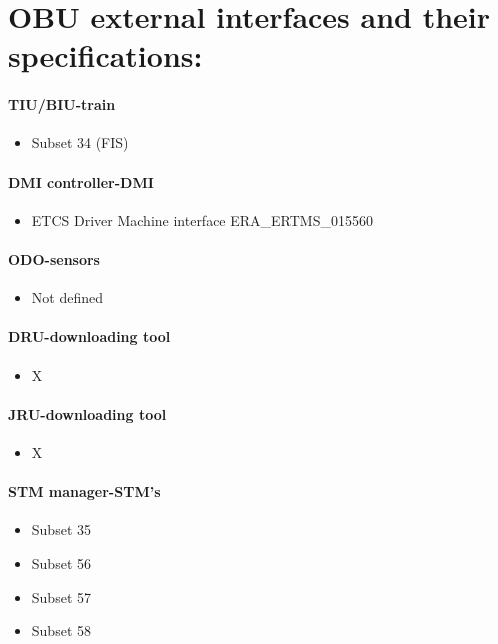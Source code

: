 \documentclass{template/openetcs_article}
\begin{document}
\section{OBU external interfaces and their specifications:}



\paragraph{TIU/BIU-train}
  \begin{itemize}
  \item Subset 34 (FIS)
  \end{itemize}

\paragraph{DMI controller-DMI}
  \begin{itemize}
  \item ETCS Driver Machine interface ERA\_ERTMS\_015560
  \end{itemize}



\paragraph{ODO-sensors}
\begin{itemize}
\item Not defined
\end{itemize}

\paragraph{DRU-downloading tool}
\begin{itemize}
\item  X
\end{itemize}

\paragraph{JRU-downloading tool}
\begin{itemize}
\item X
\end{itemize}

\paragraph{STM manager-STM{\textquoteright}s}
\begin{itemize}
\item Subset 35
\item Subset 56
\item Subset 57
\item Subset 58
\end{itemize}
\end{document}
